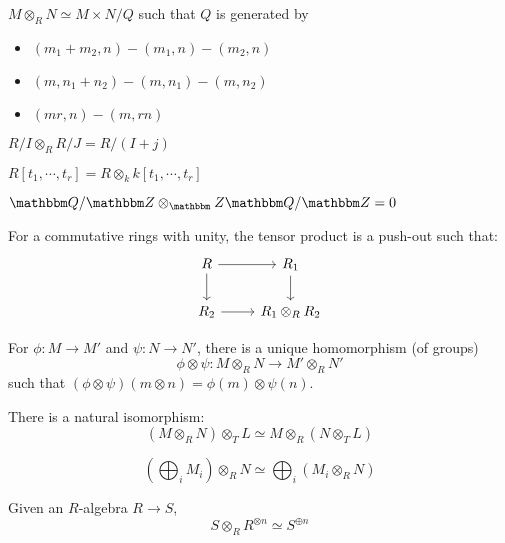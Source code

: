 \documentclass{article}
\begin{document}
\begin{theorem}
  \(M \otimes_R N \simeq M \times N / Q\)
  such that \(Q\) is generated by
  \begin{itemize}
  \item \((m_1 + m_2, n) - (m_1, n) - (m_2, n)\)
  \item \((m, n_1 + n_2) - (m, n_1) - (m, n_2)\)
  \item \((mr, n) - (m, rn)\)
  \end{itemize}
\end{theorem}

\begin{example}
  \(R/I \otimes_R R/J = R/(I + j)\)
\end{example}
\begin{example}
  \(R[t_1, \cdots, t_r] = R \otimes_k k[t_1, \cdots, t_r]\)
\end{example}
\begin{example}
  \(\bbQ/\bbZ \otimes_\bbZ \bbQ/\bbZ = 0\)
\end{example}

\begin{theorem}
  For a commutative rings with unity, the tensor product is a push-out such that:
  \[\begin{tikzcd}
    R \ar{d} \ar{r} & R_1 \ar{d} \\
    R_2 \ar{r} & R_1 \otimes_R R_2
  \end{tikzcd}\]
\end{theorem}

\begin{theorem}
  For \(\phi: M \to M'\) and \(\psi: N \to N'\),
  there is a unique homomorphism (of groups)
  \[\phi \otimes \psi: M \otimes_R N \to M' \otimes_R N'\]
  such that
  \((\phi \otimes \psi)(m \otimes n) = \phi(m) \otimes \psi(n)\).
\end{theorem}

\begin{theorem}
  There is a natural isomorphism:
  \[(M \otimes_R N) \otimes_T L \simeq M \otimes_R (N \otimes_T L)\]
\end{theorem}

\begin{theorem}
  \[(\bigoplus_i M_i) \otimes_R N \simeq \bigoplus_i(M_i \otimes_R N)\]
\end{theorem}

\begin{theorem}
  Given an \(R\)-algebra \(R \to S\),
  \[S \otimes_R R^{\otimes n} \simeq S^{\oplus n}\]
\end{theorem}
\end{document}
